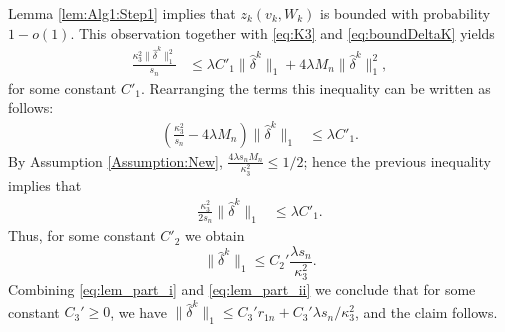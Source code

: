 \documentclass[opre,nonblindrev]{informs3} %
\begin{document}
\begin{APPENDIX}{}
Lemma \ref{lem:Alg1:Step1} implies that  $z_k(v_k,W_k)$ is bounded with probability $1-o(1)$.
This observation together with
\eqref{eq:K3} and
\eqref{eq:boundDeltaK}
 yields
 \begin{equation}
 \begin{aligned}
\frac{\kappa^2_{3}\|\hat\delta^k \|_1^2}{s_n} & \leq  \lambda C'_1 \|\hat\delta^k\|_1 +
4 \lambda  M_n  \|\hat\delta^k\|_1^2,
 \end{aligned}
 \end{equation}
 for some constant $C'_1$.
Rearranging the terms this inequality can be written as follows:
 \begin{equation}
 \begin{aligned}
\left( \frac{\kappa^2_{3}}{s_n} - 4 \lambda  M_n \right)\|\hat\delta^k \|_1
 & \leq   \lambda C'_1
 .
 \end{aligned}
 \end{equation}
By Assumption \ref{Assumption:New},
 $ \frac{4 \lambda s_n  M_n }{\kappa^2_{3}} \leq 1/2$; hence the previous inequality  implies that
 \begin{equation}
 \begin{aligned}
 \frac{\kappa^2_{3}}{2s_n} \|\hat\delta^k \|_1
 & \leq   \lambda C'_1 .
 \end{aligned}
 \end{equation}
 Thus, for some constant $C'_2$ we obtain
\begin{equation}\label{eq:lem_part_ii}
\|\hat \delta^k\|_1 \leq C_2' \frac{\lambda s_n}{\kappa^2_{3}}.
\end{equation}
Combining \eqref{eq:lem_part_i} and \eqref{eq:lem_part_ii}
we conclude that for some constant $C_3'\geq0 $, we have
$\|\hat \delta^k\|_1 \leq C_3' r_{1n} + C_3' \lambda s_n/\kappa^2_{3}$, and the claim follows.
\hfill \halmos
\endproof




\end{APPENDIX}
\end{document}
